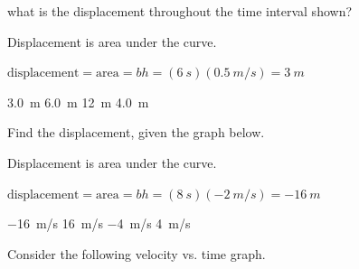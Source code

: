 \documentclass[]{exam}
\begin{document}
\begin{questions}
what is the displacement throughout the time interval shown?

\ifprintanswers
{\color{red}
Displacement is area under the curve.

$\displaystyle \text{displacement} = \text{area} = bh = (\SI{6}{s})(\SI{0.5}{m/s}) = \boxed{\SI{3}{m}}$
}
\fi

\begin{randomizeoneparchoices}
    \correctchoice \SI{3.0}{m}
    \choice \SI{6.0}{m}
    \choice \SI{12}{m}
    \choice \SI{4.0}{m}
\end{randomizeoneparchoices}

\question
Find the displacement, given the graph below.

\begin{center}
\end{center}

\ifprintanswers
{\color{red}
Displacement is area under the curve.

$\displaystyle \text{displacement} = \text{area} = bh = (\SI{8}{s})(\SI{-2}{m/s}) = \boxed{\SI{-16}{m}}$
}
\fi

\begin{randomizeoneparchoices}
    \correctchoice \SI{-16}{m/s}
    \choice \SI{16}{m/s}
    \choice \SI{-4}{m/s}
    \choice \SI{4}{m/s}
\end{randomizeoneparchoices}

\question
Consider the following velocity vs. time graph. 


\end{questions}
\end{document}
